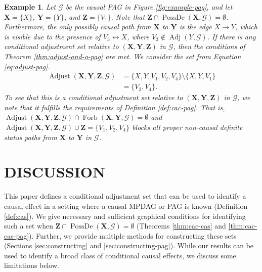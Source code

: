 \documentclass[twoside]{article}
\newtheorem{example}{Example}
\DeclareMathOperator{\PossDe}{PossDe}
\DeclareMathOperator{\Adj}{Adj}
\DeclareMathOperator{\Forb}{Forb}
\newcommand{\fb}[2][X,Y]{\Forb(\mb{#1},#2)}
\DeclareMathOperator{\Adjust}{Adjust}
\newcommand{\adjustb}[2][X,Y,Z]{\Adjust(\mb{#1},#2)}
\newcommand{\mb}[1]{\mathbf{#1}}
\newcommand{\g}[1][G]{\mathcal{#1}}
\begin{document}
\begin{example}
\label{ex:construct-pag}
    Let $\g$ be the causal PAG in Figure \ref{fig:example-pag}, and let $\mb{X} = \{X\}$, $\mb{Y}=\{Y\}$, and $\mb{Z}=\{V_1\}$. Note that $\mb{Z} \cap \PossDe(\mb{X}, \g) = \emptyset$. Furthermore, the only possibly causal path from $\mb{X}$ to $\mb{Y}$ is the edge $X \to Y$, which is visible due to the presence of $V_3 \leftrightarrow X$, where $V_3 \notin \Adj(Y,\g)$. If there is any conditional adjustment set relative to $(\mb{X,Y,Z})$ in $\g$, then the conditions of Theorem \ref{thm:adjust-and-o-pag} are met. We consider the set from Equation \eqref{eq:adjust-pag}.
    \begin{align}
        \Adjust(\mb{X},\mb{Y},\mb{Z},\g) 
            &= \{X,Y,V_1,V_2,V_4\} \setminus \{X,Y,V_1\} \nonumber\\
            &= \{V_2,V_4\}. \nonumber
    \end{align}
    To see that this is a conditional adjustment set relative to $(\mb{X,Y,Z})$ in $\g$, we note that it fulfills the requirements of Definition \ref{def:cac-pag}. That is, $\adjustb{\g} \cap \fb{\g} = \emptyset$ and $\adjustb{\g} \cup \mb{Z} =\{V_1,V_2, V_4\}$ blocks all proper non-causal definite status paths from $\mb{X}$ to $\mb{Y}$ in $\g$.
\end{example}











\section{DISCUSSION}
\label{sec:discussion}

This paper defines a conditional adjustment set that can be used to identify a causal effect in a setting where a causal MPDAG or PAG is known (Definition \ref{def:cas}). We give necessary and sufficient graphical conditions for identifying such a set when $\mb{Z} \cap \PossDe(\mb{X},\g) =\emptyset$ (Theorems \ref{thm:cac-cas} and \ref{thm:cac-cas-pag}). Further, we provide multiple methods for constructing these sets (Sections \ref{sec:constructing} and \ref{sec:constructing-pag}). While our results can be used to identify a broad class of conditional causal effects, we discuss some limitations below. 
\end{document}

